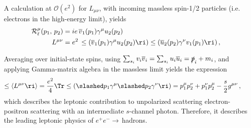 \begin{adjustwidth}{20pt}{20pt}

\end{adjustwidth}



\begin{example}
    A calculation at \(\mathcal{O}(e^2)\) for \(L_{\mu\nu}\), with incoming massless spin-1/2 particles (i.e. electrons in the high-energy limit), yields
    \begin{align}
        \mathcal{R}_\ell^\mu(p_1,\,p_2)
        &=
        ie \, \overline{v}_1(p_1) \gamma^\mu u_2(p_2)
        \\
        L^{\mu \nu}
        &=
        e^2\,
        \le(
            \overline{v}_1(p_1) \gamma^\mu u_2(p_2)
        \ri)
        \le(
            \overline{u}_2(p_2) \gamma^\nu v_1(p_1)
        \ri)
        \,,
    \end{align}

    Averaging over initial-state spins, using \(\sum_{s_i} v_i \overline{v}_i = \sum_{s_i} u_i \overline{u}_i = \slashed{p}_i + m_i\), and applying Gamma-matrix algebra in the massless limit yields the expression
    \begin{align}
        \le\langle
        L^{\mu \nu}
        \ri\rangle
        &=
        \frac{e^2}{4} \Tr\le(\slashed p_1 \gamma^\mu \slashed p_2 \gamma^\nu \ri)
        =
        p_1^\mu p_2^\nu + p_1^\nu p_2^\mu - \frac{s}{2} g^{\mu \nu}
        \,,
    \end{align}
    which describes the leptonic contribution to unpolarized scattering electron-positron scattering with an intermediate \(s\)-channel photon.
    Therefore, it describes the leading leptonic physics of \(e^+ e^- \to\,\)hadrons.
\end{example}


